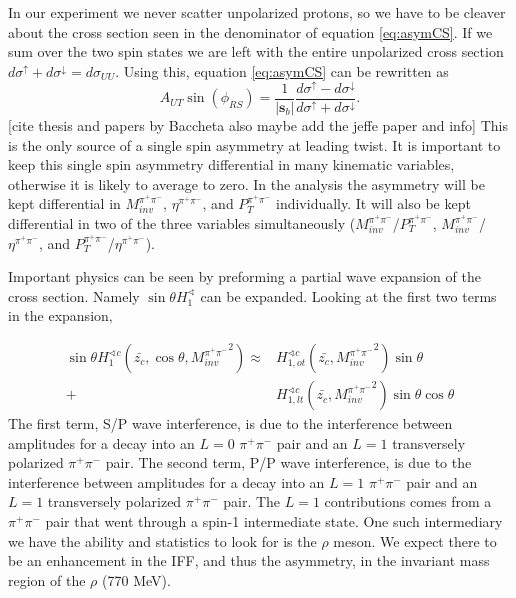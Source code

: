 \documentclass[abstract = on,listof=totoc, bibliography=totoc]{scrreprt}
\newcommand{\phirs}{\phi_{RS}}
\newcommand{\ptpair}{P_{T}^{\pi^+\pi^-}}
\newcommand{\mpair}{M_{inv}^{\pi^+\pi^-}}
\newcommand{\etapair}{\eta^{\pi^+\pi^-}}
\newcommand{\pip}{\pi^+}
\newcommand{\pim}{\pi^-}
\newcommand{\pair}{$\pip\pim$ }
\begin{document}
In our experiment we never scatter unpolarized protons, so we have to be cleaver about the cross section seen in the denominator of equation \ref{eq:asymCS}. If we sum over the two spin states we are left with the entire unpolarized cross section $d\sigma^\uparrow + d\sigma^\downarrow = d\sigma_{UU}$. Using this, equation \ref{eq:asymCS} can be rewritten as 
\begin{equation}
\label{eq:SSA}
A_{UT} \sin (\phirs) =\frac{1}{|\bm{s}_b|} \frac{d\sigma^\uparrow - d\sigma^\downarrow}{d\sigma^\uparrow + d\sigma^\downarrow}.
\end{equation}
[cite thesis and papers by Baccheta also maybe add the jeffe paper and info] 
This is the only source of a single spin asymmetry at leading twist.\cite{bacchettaRadici2} It is important to keep this single spin asymmetry differential in many kinematic variables, otherwise it is likely to average to zero\cite{keepDifferential}. In the analysis the asymmetry will be kept differential in $\mpair$, $\etapair$, and $\ptpair$ individually. It will also be kept differential in two of the three variables simultaneously ($\mpair$/$\ptpair$, $\mpair$/$\etapair$, and $\ptpair$/$\etapair$). 

Important physics can be seen by preforming a partial wave expansion of the cross section\cite{partialWave}. Namely $\sin \theta H_1^\sphericalangle$ can be expanded. Looking at the first two terms in the expansion, 


\begin{align}
\label{eq:partialwaveexpansion}
\sin \theta H_1^{\sphericalangle c} (\bar{z_c},\cos \theta, {\mpair}^2) \approx &H^{\sphericalangle c}_{1,ot}(\bar{z_c},{\mpair}^2) \sin\theta \nonumber \\
+ &H^{\sphericalangle c}_{1,lt}(\bar{z_c},{\mpair}^2) \sin\theta \cos\theta
\end{align}
%
The first term, S/P wave interference, is due to the interference between amplitudes for a decay into an $L = 0$  \pair pair and an $L = 1$ transversely polarized \pair pair. The second term, P/P wave interference, is due to the interference between amplitudes for a decay into an $L = 1$ \pair pair and an $L = 1$ transversely polarized \pair pair. The $L=1$ contributions comes from a \pair pair that went through a spin-1 intermediate state. One such intermediary we have the ability and statistics to look for is the $\rho$ meson. We expect there to be an enhancement in the IFF, and thus the asymmetry, in the invariant mass region of the $\rho$ (770 MeV). \cite{bacchettaRadici2, Tang}    
\end{document}
